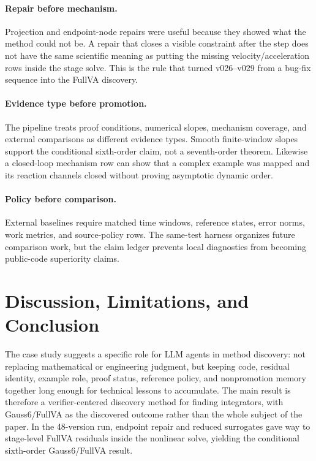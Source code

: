 \documentclass[10pt]{article}
\newcommand{\method}{Gauss6/\allowbreak FullVA}
\begin{document}
\paragraph{Repair before mechanism.}
Projection and endpoint-node repairs were useful because they showed what the
method could not be. A repair that closes a visible constraint after the step
does not have the same scientific meaning as putting the missing
velocity/acceleration rows inside the stage solve. This is the rule that turned
v026--v029 from a bug-fix sequence into the FullVA discovery.

\paragraph{Evidence type before promotion.}
The pipeline treats proof conditions, numerical slopes, mechanism coverage, and
external comparisons as different evidence types. Smooth finite-window slopes
support the conditional sixth-order claim, not a seventh-order theorem. Likewise
a closed-loop mechanism row can show that a complex example was mapped and its
reaction channels closed without proving asymptotic dynamic order.

\paragraph{Policy before comparison.}
External baselines require matched time windows, reference states, error norms,
work metrics, and source-policy rows. The same-test harness organizes future
comparison work, but the claim ledger prevents local diagnostics from becoming
public-code superiority claims.

\section{Discussion, Limitations, and Conclusion}

The case study suggests a specific role for LLM agents in method discovery:
not replacing mathematical or engineering judgment, but keeping code, residual
identity, example role, proof status, reference policy, and nonpromotion memory
together long enough for technical lessons to accumulate. The main result is
therefore a verifier-centered discovery method for finding integrators, with
\method{} as the discovered outcome rather than the whole subject of the paper.
In the 48-version run, endpoint repair and reduced surrogates gave way to
stage-level FullVA residuals inside the nonlinear solve, yielding the
conditional sixth-order \method{} result.
\end{document}
